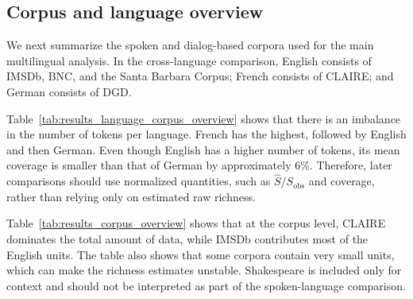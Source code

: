 ﻿\documentclass{article}
\begin{document}
\subsection{Corpus and language overview}

We next summarize the spoken and dialog-based corpora used for the main multilingual analysis. In the cross-language comparison, English consists of IMSDb, BNC, and the Santa Barbara Corpus; French consists of CLAIRE; and German consists of DGD.

\vspace{1em}

\begin{table}[htbp]
    \centering
    \caption{Language-level overview of the spoken corpora used in the cross-language comparison. Shakespeare is excluded because it is a written literary corpus.}
    \label{tab:results_language_corpus_overview}
\end{table}

Table~\ref{tab:results_language_corpus_overview} shows that there is an imbalance in the number of tokens per language. French has the highest, followed by English and then German. Even though English has a higher number of tokens, its mean coverage is smaller than that of German by approximately 6\%. Therefore, later comparisons should use normalized quantities, such as $\hat{S}/S_{\mathrm{obs}}$ and coverage, rather than relying only on estimated raw richness.

Table~\ref{tab:results_corpus_overview} shows that at the corpus level, CLAIRE dominates the total amount of data, while IMSDb contributes most of the English units. The table also shows that some corpora contain very small units, which can make the richness estimates unstable. Shakespeare is included only for context and should not be interpreted as part of the spoken-language comparison.

\vspace{1em}
\end{document}
